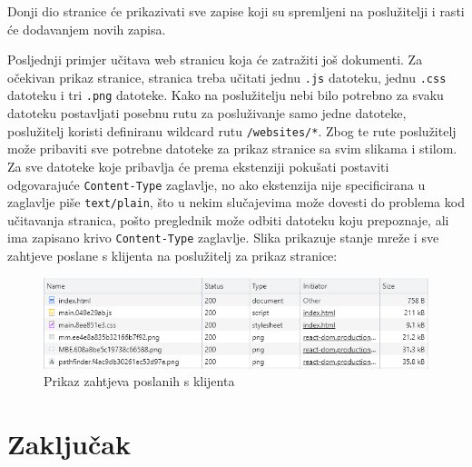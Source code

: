\documentclass[]{foi} %
\begin{document}
Donji dio stranice će prikazivati sve zapise koji su spremljeni na poslužitelji
i rasti će dodavanjem novih zapisa.

Posljednji primjer učitava web stranicu koja će zatražiti još dokumenti. Za očekivan
prikaz stranice, stranica treba učitati jednu \texttt{.js} datoteku, jednu \texttt{.css}
datoteku i tri \texttt{.png} datoteke. Kako na poslužitelju nebi bilo potrebno za svaku
datoteku postavljati posebnu rutu za posluživanje samo jedne datoteke, poslužitelj
koristi definiranu wildcard rutu \texttt{/websites/*}. Zbog te rute poslužitelj može
pribaviti sve potrebne datoteke za prikaz stranice sa svim slikama i stilom.
Za sve datoteke koje pribavlja će prema ekstenziji pokušati postaviti odgovarajuće
\texttt{Content-Type} zaglavlje, no ako ekstenzija nije specificirana u zaglavlje piše
\texttt{text/plain}, što u nekim slučajevima može dovesti do problema kod učitavanja
stranica, pošto preglednik može odbiti datoteku koju prepoznaje, ali ima zapisano krivo
\texttt{Content-Type} zaglavlje.
Slika prikazuje stanje mreže i sve zahtjeve poslane s klijenta na poslužitelj za
prikaz stranice:
\begin{figure}[h]
    \centering
    \includegraphics[width=\textwidth]{slike/mreza.png}
    \caption{Prikaz zahtjeva poslanih s klijenta}
    \label{fig:mreza}
\end{figure}


\chapter{Zaključak}

\lipsum[1-2]

\makebackmatter
\end{document}
